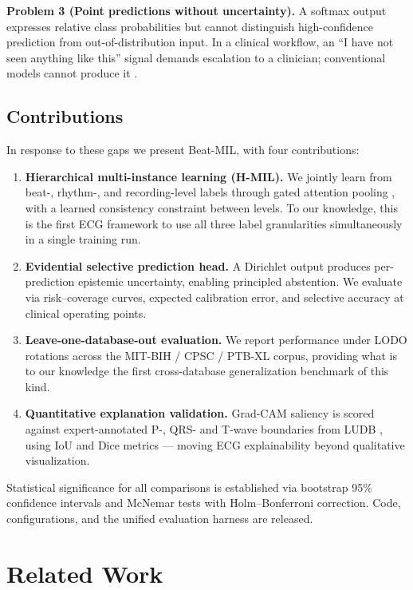 \documentclass[conference]{IEEEtran}
\begin{document}
\textbf{Problem 3 (Point predictions without uncertainty).} A softmax output expresses relative class probabilities but cannot distinguish high-confidence prediction from out-of-distribution input. In a clinical workflow, an ``I have not seen anything like this'' signal demands escalation to a clinician; conventional models cannot produce it \cite{geifman2017,rudin2019}.

\subsection{Contributions}

In response to these gaps we present Beat-MIL, with four contributions:

\begin{enumerate}
\item \textbf{Hierarchical multi-instance learning (H-MIL).} We jointly learn from beat-, rhythm-, and recording-level labels through gated attention pooling \cite{ilse2018}, with a learned consistency constraint between levels. To our knowledge, this is the first ECG framework to use all three label granularities simultaneously in a single training run.
\item \textbf{Evidential selective prediction head.} A Dirichlet output \cite{sensoy2018} produces per-prediction epistemic uncertainty, enabling principled abstention. We evaluate via risk--coverage curves, expected calibration error, and selective accuracy at clinical operating points.
\item \textbf{Leave-one-database-out evaluation.} We report performance under LODO rotations across the MIT-BIH / CPSC / PTB-XL corpus, providing what is to our knowledge the first cross-database generalization benchmark of this kind.
\item \textbf{Quantitative explanation validation.} Grad-CAM \cite{selvaraju2017} saliency is scored against expert-annotated P-, QRS- and T-wave boundaries from LUDB \cite{ludb2020}, using IoU and Dice metrics --- moving ECG explainability beyond qualitative visualization.
\end{enumerate}

Statistical significance for all comparisons is established via bootstrap 95\% confidence intervals and McNemar tests with Holm--Bonferroni correction. Code, configurations, and the unified evaluation harness are released.

\section{Related Work}
\end{document}
